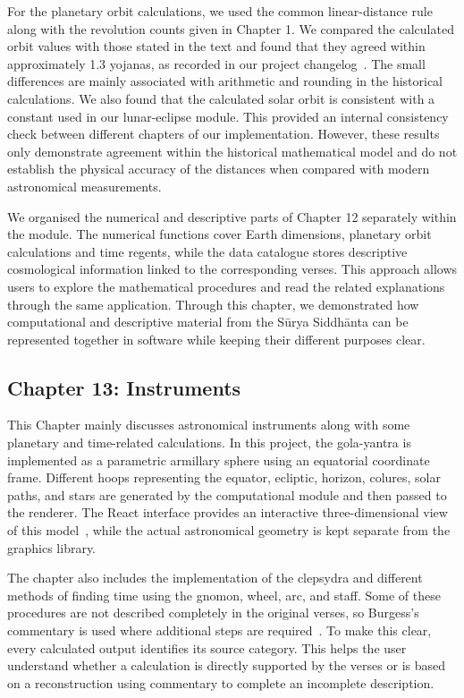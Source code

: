\documentclass[12pt,a4paper,oneside]{report}
\newcommand{\surya}{Sūrya Siddhānta\xspace}
\begin{document}
For the planetary orbit calculations, we used the common linear-distance rule along with the revolution counts given in Chapter 1. We compared the calculated orbit values with those stated in the text and found that they agreed within approximately 1.3 yojanas, as recorded in our project changelog~\cite{nigam_repo}. The small differences are mainly associated with arithmetic and rounding in the historical calculations. We also found that the calculated solar orbit is consistent with a constant used in our lunar-eclipse module. This provided an internal consistency check between different chapters of our implementation. However, these results only demonstrate agreement within the historical mathematical model and do not establish the physical accuracy of the distances when compared with modern astronomical measurements.

We organised the numerical and descriptive parts of Chapter 12 separately within the module. The numerical functions cover Earth dimensions, planetary orbit calculations and time regents, while the data catalogue stores descriptive cosmological information linked to the corresponding verses. This approach allows users to explore the mathematical procedures and read the related explanations through the same application. Through this chapter, we demonstrated how computational and descriptive material from the \surya can be represented together in software while keeping their different purposes clear.

\subsection{Chapter 13: Instruments}

This Chapter mainly discusses astronomical instruments along with some planetary and time-related calculations. In this project, the gola-yantra is implemented as a parametric armillary sphere using an equatorial coordinate frame. Different hoops representing the equator, ecliptic, horizon, colures, solar paths, and stars are generated by the computational module and then passed to the renderer. The React interface provides an interactive three-dimensional view of this model~\cite{react,threejs}, while the actual astronomical geometry is kept separate from the graphics library.

The chapter also includes the implementation of the clepsydra and different methods of finding time using the gnomon, wheel, arc, and staff. Some of these procedures are not described completely in the original verses, so Burgess's commentary is used where additional steps are required~\cite{burgess1860}. To make this clear, every calculated output identifies its source category. This helps the user understand whether a calculation is directly supported by the verses or is based on a reconstruction using commentary to complete an incomplete description.
\end{document}
